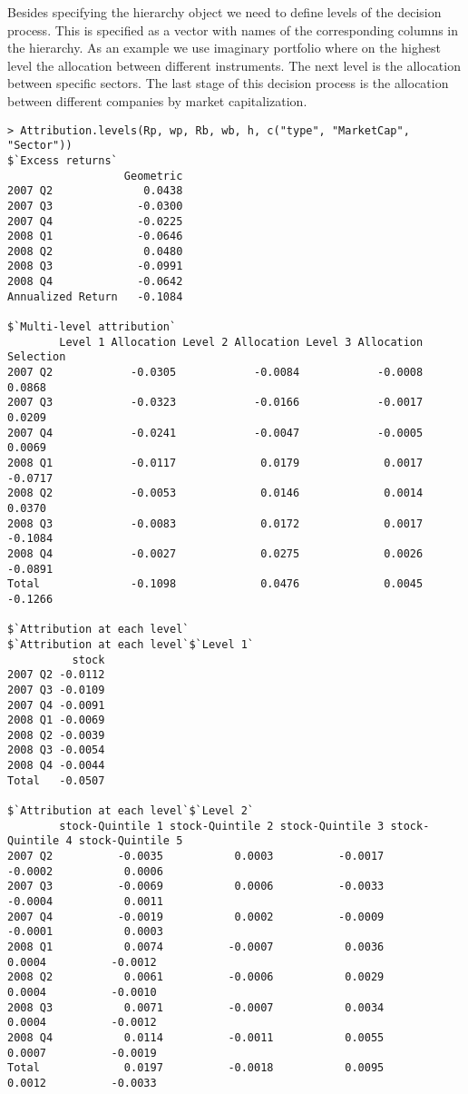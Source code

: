 \documentclass[11pt,a4paper]{article}
\begin{document}
Besides specifying the hierarchy object we need to define levels of the decision process. This is specified as a vector with names of the corresponding columns in the hierarchy. As an example we use imaginary portfolio where on the highest level the allocation between different instruments. The next level is the allocation between specific sectors. The last stage of this decision process is the allocation between different companies by market capitalization.
\begingroup
\fontsize{9pt}{12pt}\selectfont
\begin{verbatim}
> Attribution.levels(Rp, wp, Rb, wb, h, c("type", "MarketCap", "Sector"))
$`Excess returns`
                  Geometric
2007 Q2              0.0438
2007 Q3             -0.0300
2007 Q4             -0.0225
2008 Q1             -0.0646
2008 Q2              0.0480
2008 Q3             -0.0991
2008 Q4             -0.0642
Annualized Return   -0.1084

$`Multi-level attribution`
        Level 1 Allocation Level 2 Allocation Level 3 Allocation Selection
2007 Q2            -0.0305            -0.0084            -0.0008    0.0868
2007 Q3            -0.0323            -0.0166            -0.0017    0.0209
2007 Q4            -0.0241            -0.0047            -0.0005    0.0069
2008 Q1            -0.0117             0.0179             0.0017   -0.0717
2008 Q2            -0.0053             0.0146             0.0014    0.0370
2008 Q3            -0.0083             0.0172             0.0017   -0.1084
2008 Q4            -0.0027             0.0275             0.0026   -0.0891
Total              -0.1098             0.0476             0.0045   -0.1266

$`Attribution at each level`
$`Attribution at each level`$`Level 1`
          stock
2007 Q2 -0.0112
2007 Q3 -0.0109
2007 Q4 -0.0091
2008 Q1 -0.0069
2008 Q2 -0.0039
2008 Q3 -0.0054
2008 Q4 -0.0044
Total   -0.0507

$`Attribution at each level`$`Level 2`
        stock-Quintile 1 stock-Quintile 2 stock-Quintile 3 stock-Quintile 4 stock-Quintile 5
2007 Q2          -0.0035           0.0003          -0.0017          -0.0002           0.0006
2007 Q3          -0.0069           0.0006          -0.0033          -0.0004           0.0011
2007 Q4          -0.0019           0.0002          -0.0009          -0.0001           0.0003
2008 Q1           0.0074          -0.0007           0.0036           0.0004          -0.0012
2008 Q2           0.0061          -0.0006           0.0029           0.0004          -0.0010
2008 Q3           0.0071          -0.0007           0.0034           0.0004          -0.0012
2008 Q4           0.0114          -0.0011           0.0055           0.0007          -0.0019
Total             0.0197          -0.0018           0.0095           0.0012          -0.0033


\end{verbatim}
\end{document}
